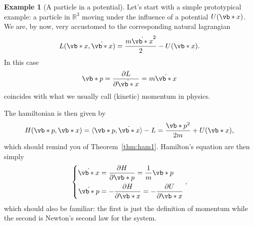\documentclass[english,fontsize=11pt,paper=b5]{scrbook}
\numberwithin{equation}{chapter}
\theoremstyle{definition}
\newtheorem{example}{Example}[chapter]
\begin{document}
    \begin{example}[A particle in a potential]\label{ex:hamPot}
      Let's start with a simple prototypical example: a particle in $\mathbb{R}^3$ moving under the influence of a potential $U(\vb*{x})$.
      We are, by now, very accustomed to the corresponding natural lagrangian
      \begin{equation}
        L(\vb*{x},\dot{\vb*{x}}) = \frac{m \dot{\vb*{x}}^2}{2} - U(\vb*{x}).
      \end{equation}
      In this case
      \begin{equation}
        \vb*{p} = \frac{\partial L}{\partial \dot{\vb*{x}}} = m \dot{\vb*{x}}
      \end{equation}
      coincides with what we usually call (kinetic) momentum in physics.

      The hamiltonian is then given by
      \begin{equation}
        H(\vb*{p},\vb*{x}) = \langle\vb*{p}, \dot{\vb*{x}}\rangle - L = \frac {\vb*{p}^2}{2m} + U(\vb*{x}),
      \end{equation}
      which should remind you of Theorem~\ref{thm:ham1}.
      Hamilton's equation are then simply
      \begin{equation}
        \left\lbrace
          \begin{aligned}
            \dot{\vb*{x}}   & = \frac{\partial H}{\partial \vb*{p}} = \frac1m \vb*{p}                        \\
            \dot {\vb*{p}} & = - \frac{\partial H}{\partial \vb*{x}} = -\frac{\partial U}{\partial \vb*{x}}
          \end{aligned}
        \right.,
      \end{equation}
      which should also be familiar: the first is just the definition of momentum while the second is Newton's second law for the system.
    \end{example}
\end{document}
